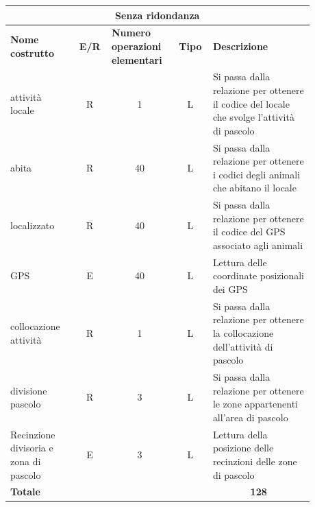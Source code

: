 \documentclass[12pt,a4paper]{article}
\begin{document}
\begin{center}\setlength{\extrarowheight}{1.5pt}\begin{longtable}{|p{0.2\linewidth}|p{0.1\linewidth}|p{0.175\linewidth}|p{0.1\linewidth}|p{0.3\linewidth}|}
\hline
\multicolumn{5}{|c|}{Senza ridondanza}
\\
\hline \textbf{Nome costrutto}   & \multicolumn{1}{|c|}{\textbf{E/R}} & \textbf{Numero operazioni elementari} & \multicolumn{1}{|c|}{\textbf{Tipo}} & \textbf{Descrizione}\\ 

\hline
attività locale
 & 
\multicolumn{1}{|c|}{R}
 & 
\multicolumn{1}{|c|}{1}
 & 
\multicolumn{1}{|c|}{L}
 & 
Si passa dalla relazione per ottenere il codice del locale che svolge l'attività di pascolo
\\
\hline
abita
 & 
\multicolumn{1}{|c|}{R}
 & 
\multicolumn{1}{|c|}{40}
 & 
\multicolumn{1}{|c|}{L}
 & 
Si passa dalla relazione per ottenere i codici degli animali che abitano il locale
\\
\hline
localizzato
 & 
\multicolumn{1}{|c|}{R}
 & 
\multicolumn{1}{|c|}{40}
 & 
\multicolumn{1}{|c|}{L}
 & 
Si passa dalla relazione per ottenere il codice del GPS associato agli animali
\\
\hline
GPS
 & 
\multicolumn{1}{|c|}{E}
 & 
\multicolumn{1}{|c|}{40}
 & 
\multicolumn{1}{|c|}{L}
 & 
Lettura delle coordinate posizionali dei GPS
\\
\hline
collocazione attività
 & 
\multicolumn{1}{|c|}{R}
 & 
\multicolumn{1}{|c|}{1}
 & 
\multicolumn{1}{|c|}{L}
 & 
Si passa dalla relazione per ottenere la collocazione dell'attività di pascolo
\\
\hline
divisione pascolo
 & 
\multicolumn{1}{|c|}{R}
 & 
\multicolumn{1}{|c|}{3}
 & 
\multicolumn{1}{|c|}{L}
 & 
Si passa dalla relazione per ottenere le zone appartenenti all'area di pascolo
\\
\hline
Recinzione divisoria e zona di pascolo
 & 
\multicolumn{1}{|c|}{E}
 & 
\multicolumn{1}{|c|}{3}
 & 
\multicolumn{1}{|c|}{L}
 & 
Lettura della posizione delle recinzioni delle zone di pascolo
\\
\hline
\multicolumn{4}{|l|}{\textbf{Totale}}
 & 
\multicolumn{1}{|c|}{\textbf{128}}
\\
\hline
\end{longtable}\end{center}
\end{document}
